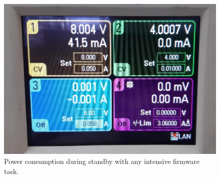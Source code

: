 \begin{figure}[!ht]
    \begin{center}
        \includegraphics[width=0.44\columnwidth]{figures/v01/power-consumption.jpg}
        \caption{Power consumption during standby with any intensive firmware task.}
        \label{fig:power-consumption}
    \end{center}
\end{figure}

